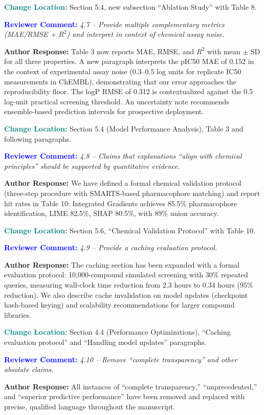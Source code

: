 \documentclass[12pt]{article}
\newcommand{\RC}[1]{\textbf{\textcolor{blue}{Reviewer Comment:}} \textit{#1}\vspace{0.3em}}
\newcommand{\AR}[1]{\textbf{Author Response:} #1\vspace{0.8em}}
\newcommand{\CH}[1]{\textbf{\textcolor{teal}{Change Location:}} #1\vspace{0.5em}}
\begin{document}
\CH{Section 5.4, new subsection ``Ablation Study'' with Table 8.}

\bigskip

\RC{4.7 -- Provide multiple complementary metrics (MAE/RMSE + $R^2$) and interpret in context of chemical assay noise.}

\AR{Table 3 now reports MAE, RMSE, and $R^2$ with mean $\pm$ SD for all three properties. A new paragraph interprets the pIC50 MAE of 0.152 in the context of experimental assay noise (0.3--0.5 log units for replicate IC50 measurements in ChEMBL), demonstrating that our error approaches the reproducibility floor. The logP RMSE of 0.312 is contextualized against the 0.5 log-unit practical screening threshold. An uncertainty note recommends ensemble-based prediction intervals for prospective deployment.}

\CH{Section 5.4 (Model Performance Analysis), Table 3 and following paragraphs.}

\bigskip

\RC{4.8 -- Claims that explanations ``align with chemical principles'' should be supported by quantitative evidence.}

\AR{We have defined a formal chemical validation protocol (three-step procedure with SMARTS-based pharmacophore matching) and report hit rates in Table 10: Integrated Gradients achieves 85.5\% pharmacophore identification, LIME 82.5\%, SHAP 80.5\%, with 89\% union accuracy.}

\CH{Section 5.6, ``Chemical Validation Protocol'' with Table 10.}

\bigskip

\RC{4.9 -- Provide a caching evaluation protocol.}

\AR{The caching section has been expanded with a formal evaluation protocol: 10,000-compound simulated screening with 30\% repeated queries, measuring wall-clock time reduction from 2.3 hours to 0.34 hours (95\% reduction). We also describe cache invalidation on model updates (checkpoint hash-based keying) and scalability recommendations for larger compound libraries.}

\CH{Section 4.4 (Performance Optimizations), ``Caching evaluation protocol'' and ``Handling model updates'' paragraphs.}

\bigskip

\RC{4.10 -- Remove ``complete transparency'' and other absolute claims.}

\AR{All instances of ``complete transparency,'' ``unprecedented,'' and ``superior predictive performance'' have been removed and replaced with precise, qualified language throughout the manuscript.}
\end{document}
